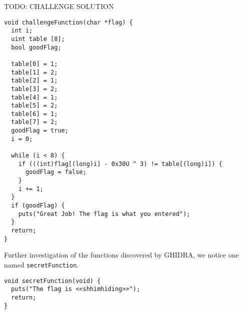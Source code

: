 TODO: CHALLENGE SOLUTION

\begin{lstlisting}
void challengeFunction(char *flag) {
  int i;
  uint table [8];
  bool goodFlag;
  
  table[0] = 1;
  table[1] = 2;
  table[2] = 1;
  table[3] = 2;
  table[4] = 1;
  table[5] = 2;
  table[6] = 1;
  table[7] = 2;
  goodFlag = true;
  i = 0;

  while (i < 8) {
    if (((int)flag[(long)i] - 0x30U ^ 3) != table[(long)i]) {
      goodFlag = false;
    }
    i += 1;
  }
  if (goodFlag) {
    puts("Great Job! The flag is what you entered");
  }
  return;
}
\end{lstlisting}

Further investigation of the functions discovered by GHIDRA, we notice one named \texttt{secretFunction}.
\begin{lstlisting}
void secretFunction(void) {
  puts("The flag is <<shhimhiding>>");
  return;
}
\end{lstlisting}


